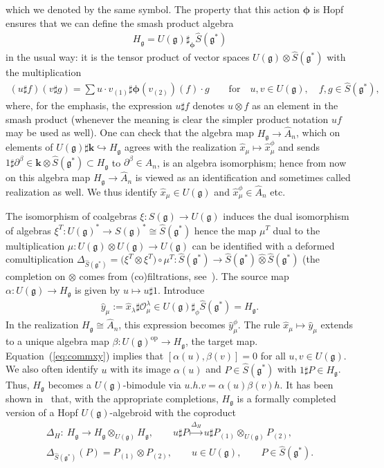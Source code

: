 \documentclass[pdftex]{sigma}
\def\op{\mathrm{op}}
\def\genfd{\mathbf{k}}
\def\gg{\mathfrak{g}}
\def\hx{\hat{x}}
\def\hy{\hat{y}}
\numberwithin{equation}{section}
\begin{document}
which we denoted by the same symbol. The property that this action ${\boldsymbol \phi}$ is Hopf ensures that we can define the smash product algebra
\begin{gather*}
H_\gg = U(\gg)\sharp_{{\boldsymbol \phi}}\hat{S}(\gg^*)
\end{gather*}
in the usual way: it is the tensor product of vector spaces $U(\gg)\otimes\hat{S}(\gg^*)$ with the multiplication
\begin{gather*}(u\sharp f) (v\sharp g) = \sum u\cdot v_{(1)}\sharp {\boldsymbol \phi}(v_{(2)})(f)\cdot g\qquad \text{for}\quad u,v\in U(\gg),\quad f,g\in\hat{S}(\gg^*),\end{gather*}
where, for the emphasis, the expression $u\sharp f$ denotes $u\otimes f$ as an element in the smash product (whenever the meaning is clear the simpler product notation $u f$ may be used as well). One can check that the algebra map $H_\gg\to\hat{A}_n$, which on elements of $U(\gg)\sharp\genfd \hookrightarrow H_\gg$ agrees with the realization $\hat{x}_\mu\mapsto\hat{x}^\phi_\mu$ and sends $1\sharp\partial^\beta\in \genfd\otimes\hat{S}(\gg^*)\subset H_\gg$ to $\partial^\beta\in A_n$, is an algebra isomorphism; hence from now on this algebra map $H_\gg\to\hat{A}_n$ is viewed as an identification and sometimes called realization as well. We thus identify $\hat{x}_\mu\in U(\gg)$ and $\hat{x}^\phi_\mu\in \hat{A}_n$ etc.

The isomorphism of coalgebras $\xi\colon S(\gg)\to U(\gg)$ induces the dual isomorphism of algebras $\xi^T\colon U(\gg)^*\to S(\gg)^*\cong \hat{S}(\gg^*)$ hence the map $\mu^T$ dual to the multiplication $\mu\colon U(\gg)\otimes U(\gg)\to U(\gg)$ can be identified with a deformed comultiplication $\Delta_{\hat{S}(\gg^*)} = \big(\xi^T\otimes\xi^T\big)\circ\mu^T\colon \hat{S}(\gg^*) \to\hat{S}(\gg^*)\hat\otimes\hat{S}(\gg^*)$ (the completion on $\otimes$ comes from (co)filtrations, see~\cite{halg}). The source map $\alpha\colon U(\gg)\to H_\gg$ is given by $u\mapsto u\sharp 1$. Introduce
\begin{gather*}
\hy_\mu := \hx_\lambda\sharp\mathcal{O}^\lambda_\mu\in U(\gg)\sharp_\phi\hat{S}(\gg^*) = H_\gg.
\end{gather*}
In the realization $H_\gg\cong\hat{A}_n$, this expression becomes $\hy_\mu^\phi$. The rule $\hx_\mu\mapsto\hy_\mu$ extends to a unique algebra map $\beta\colon U(\gg)^\op\to H_\gg$, the target map. Equation~(\ref{eq:commxy}) implies that $[\alpha(u),\beta(v)] = 0$ for all $u,v\in U(\gg)$. We also often identify $u$ with its image $\alpha(u)$ and $P\in\hat{S}(\gg^*)$ with $1\sharp P\in H_\gg$. Thus, $H_\gg$ becomes a $U(\gg)$-bimodule via $u.h.v = \alpha(u)\beta(v)h$. It has been shown in~\cite{halg} that, with the appropriate completions, $H_\gg$ is a formally completed version of a Hopf $U(\gg)$-algebroid with the coproduct
\begin{gather*}
\Delta_H \colon \ H_\gg\to H_\gg\hat\otimes_{U(\gg)}H_\gg,\qquad
u\sharp P\stackrel{\Delta_H}\mapsto u \sharp P_{(1)}\otimes_{U(\gg)} P_{(2)},\\
\Delta_{\hat{S}(\gg^*)}(P) = P_{(1)}\otimes P_{(2)},\qquad u\in U(\gg), \qquad P\in\hat{S}(\gg^*).
\end{gather*}
\end{document}
